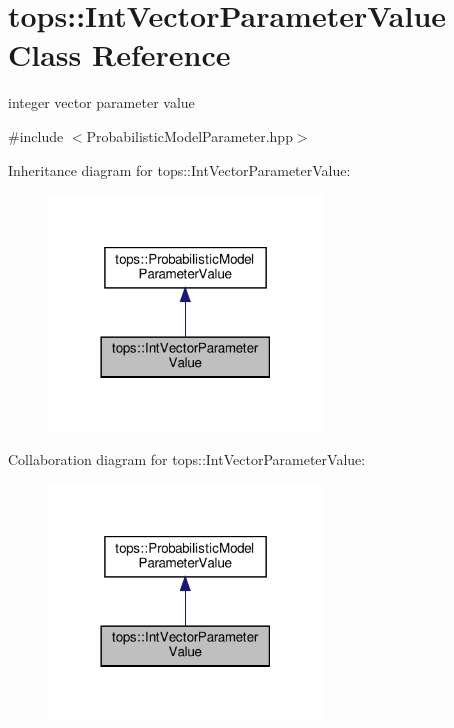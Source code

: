\hypertarget{classtops_1_1IntVectorParameterValue}{}\section{tops\+:\+:Int\+Vector\+Parameter\+Value Class Reference}
\label{classtops_1_1IntVectorParameterValue}


integer vector parameter value  




{\ttfamily \#include $<$Probabilistic\+Model\+Parameter.\+hpp$>$}



Inheritance diagram for tops\+:\+:Int\+Vector\+Parameter\+Value\+:
\nopagebreak
\begin{figure}[H]
\begin{center}
\leavevmode
\includegraphics[width=206pt]{classtops_1_1IntVectorParameterValue__inherit__graph}
\end{center}
\end{figure}


Collaboration diagram for tops\+:\+:Int\+Vector\+Parameter\+Value\+:
\nopagebreak
\begin{figure}[H]
\begin{center}
\leavevmode
\includegraphics[width=206pt]{classtops_1_1IntVectorParameterValue__coll__graph}
\end{center}
\end{figure}
